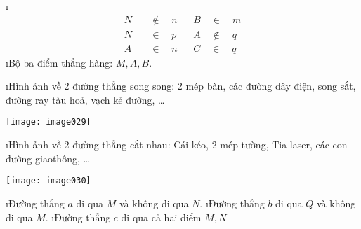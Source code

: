 \begin{Answer}{2}
		\begin{enumerate}[a),leftmargin=*]
			\i \begin{align*}
				N& \quad\boxed{\notin} \quad n && B \quad\boxed{\in} \quad m\\
				N& \quad\boxed{\in} \quad p && A \quad\boxed{\notin} \quad q\\
				A& \quad\boxed{\in} \quad n && C \quad\boxed{\in} \quad q
			\end{align*}
			\i Bộ ba điểm thẳng hàng:  $M,A,B$.
		\end{enumerate}
	
\end{Answer}
\begin{Answer}{3}
		\begin{enumerate}[--,leftmargin=*]
			\i Hình ảnh về 2 đường thẳng song song: 2 mép bàn, các đường dây điện, song sắt, đường ray tàu hoả, vạch kẻ đường, \ldots
			\begin{center}
				\texttt{[image: image029]}
			\end{center}
		\i Hình ảnh về 2 đường thẳng cắt nhau: Cái kéo, 2 mép tường, Tia laser, các con đường giao\linebreak thông, \ldots
		\begin{center}
			\texttt{[image: image030]}
		\end{center}
		\end{enumerate}
	
\end{Answer}
\begin{Answer}{4}
		\begin{enumerate}[a),leftmargin=*]
			\i Đường thẳng  $a$ đi qua $M$ và không đi qua $N$.
			\i Đường thẳng $b$ đi qua $Q$  và không đi qua $M$.
			\i Đường thẳng $c$ đi qua cả hai điểm $M,N$
		\end{enumerate}
	
\end{Answer}
